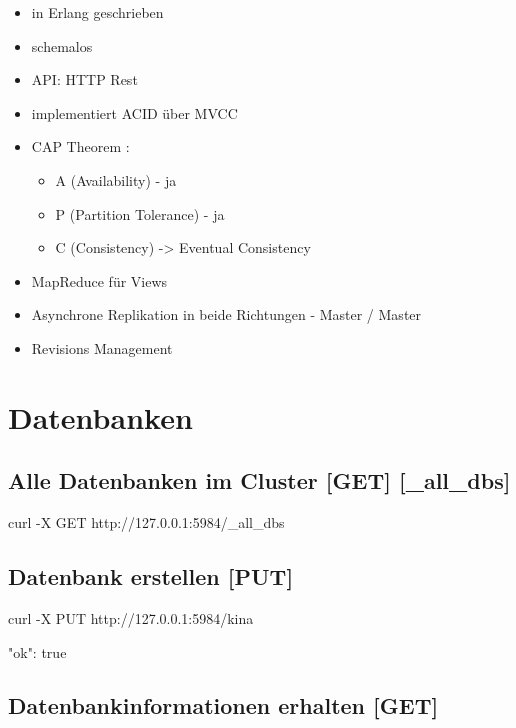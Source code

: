 \documentclass[19pt,landscape,twocolumn]{article}
\newcommand{\htmlverb}[1]{{[}\textbf{{#1}}{]}}
\newcommand{\setparskip}{\setlength{\parskip}{-6mm}}
\newcommand{\resetparskip}{\setlength{\parskip}{1mm}}
\begin{document}
\begin{itemize}
  \setlength{\parskip}{0pt}
  \item in Erlang \cite{4} geschrieben
  \item schemalos
  \item API: HTTP Rest \cite{5}
  \item implementiert ACID \cite{6} über MVCC \cite{7}
  \item CAP Theorem \cite{8}:
    \begin{itemize}
      \item A (Availability) - ja
      \item P (Partition Tolerance) - ja
      \item C (Consistency) -> Eventual Consistency
    \end{itemize}
  \item MapReduce \cite{9} für Views
  \item Asynchrone Replikation in beide Richtungen - Master / Master
  \item Revisions Management
\end{itemize}

\section{Datenbanken}
\subsection{Alle Datenbanken im Cluster \htmlverb{GET} \htmlverb{\_all\_dbs}}

\begin{code}
curl -X GET http://127.0.0.1:5984/_all_dbs
\end{code}
\setparskip
\begin{response}
\end{response}
\resetparskip

\subsection{Datenbank erstellen \htmlverb{PUT}}

\begin{code}
curl -X PUT http://127.0.0.1:5984/kina
\end{code}
\setparskip
\begin{response}
{"ok": true}
\end{response}
\resetparskip

\subsection{Datenbankinformationen erhalten \htmlverb{GET}}
\end{document}
